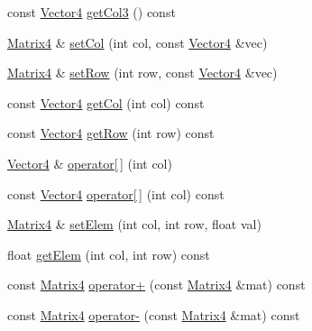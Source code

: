 \begin{DoxyCompactItemize}
\item 
const \hyperlink{classVectormath_1_1Aos_1_1Vector4}{Vector4} \hyperlink{classVectormath_1_1Aos_1_1Matrix4_afa7a80b51829c7972210d619b764658e}{get\-Col3} () const 
\item 
\hyperlink{classVectormath_1_1Aos_1_1Matrix4}{Matrix4} \& \hyperlink{classVectormath_1_1Aos_1_1Matrix4_a74535c553b8a9234ee0c82e9a6f91ae5}{set\-Col} (int col, const \hyperlink{classVectormath_1_1Aos_1_1Vector4}{Vector4} \&vec)
\item 
\hyperlink{classVectormath_1_1Aos_1_1Matrix4}{Matrix4} \& \hyperlink{classVectormath_1_1Aos_1_1Matrix4_a1e91c25cfc890cbe785ac70d40d005c2}{set\-Row} (int row, const \hyperlink{classVectormath_1_1Aos_1_1Vector4}{Vector4} \&vec)
\item 
const \hyperlink{classVectormath_1_1Aos_1_1Vector4}{Vector4} \hyperlink{classVectormath_1_1Aos_1_1Matrix4_a4faff444850b3255e9a1c74eedd54399}{get\-Col} (int col) const 
\item 
const \hyperlink{classVectormath_1_1Aos_1_1Vector4}{Vector4} \hyperlink{classVectormath_1_1Aos_1_1Matrix4_ae0904650e9e70a4f5f919d8e7a174028}{get\-Row} (int row) const 
\item 
\hyperlink{classVectormath_1_1Aos_1_1Vector4}{Vector4} \& \hyperlink{classVectormath_1_1Aos_1_1Matrix4_ab927e8827863e8a3b2bb605f414152d2}{operator\mbox{[}$\,$\mbox{]}} (int col)
\item 
const \hyperlink{classVectormath_1_1Aos_1_1Vector4}{Vector4} \hyperlink{classVectormath_1_1Aos_1_1Matrix4_a4c95ed261847ac0f8392d7c6153ebb13}{operator\mbox{[}$\,$\mbox{]}} (int col) const 
\item 
\hyperlink{classVectormath_1_1Aos_1_1Matrix4}{Matrix4} \& \hyperlink{classVectormath_1_1Aos_1_1Matrix4_a4ca59f395e1037892dff2bb35eab821a}{set\-Elem} (int col, int row, float val)
\item 
float \hyperlink{classVectormath_1_1Aos_1_1Matrix4_a871940538664158e8d98cc62a4c2cff4}{get\-Elem} (int col, int row) const 
\item 
const \hyperlink{classVectormath_1_1Aos_1_1Matrix4}{Matrix4} \hyperlink{classVectormath_1_1Aos_1_1Matrix4_a36970ffb49dd6b80112474370306fef0}{operator+} (const \hyperlink{classVectormath_1_1Aos_1_1Matrix4}{Matrix4} \&mat) const 
\item 
const \hyperlink{classVectormath_1_1Aos_1_1Matrix4}{Matrix4} \hyperlink{classVectormath_1_1Aos_1_1Matrix4_a8a464a8ae3bd1827dd0fe42b89736573}{operator-\/} (const \hyperlink{classVectormath_1_1Aos_1_1Matrix4}{Matrix4} \&mat) const 
\item 

\end{DoxyCompactItemize}
